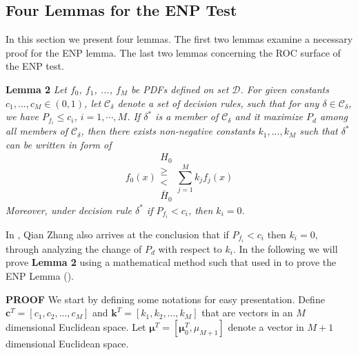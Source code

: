 \subsection{Four Lemmas for the ENP Test}
In this section we present four lemmas. The first two lemmas examine a necessary proof for the ENP lemma. The last two lemmas concerning the ROC surface of the ENP test.  

\newcommand{\bmu}{\boldsymbol{\mu}}
\typeout{}


\noindent \textbf{Lemma 2}
\noindent \textit{
Let $f_0$, $f_1$, ..., $f_M$ be PDFs defined on set $\mathcal{D}$. For given constants $c_1, ..., c_M \in (0, 1)$, let $\mathcal{C}_\delta$ denote a set of decision rules,  such that for any $\delta \in \mathcal{C}_\delta$, we have $P_{f_i} \leq c_i$, $i = 1, \cdots, M$.
If  $\delta^{\ast}$ is a member of $\mathcal{C}_\delta$ and it maximize $P_d$ among all members of $\mathcal{C}_\delta$, then there exists non-negative constants $k_1, ..., k_M$ such that $\delta^\ast$ can be written in form of  
\begin{equation}
f_0(x) \substack{H_0 \\ \geq \\ < \\ \bar{H}_0} \sum_{j=1}^{M}k_jf_j(x)
\end{equation}
Moreover, under decision rule $\delta^\ast$ if  $P_{f_i} < c_i$, then $k_i = 0$. 
}

In \cite{zhang1999design, zhang2000efficient}, Qian Zhang also arrives at the conclusion that if $P_{f_i} < c_i$ then $k_i = 0$, through analyzing the change of $P_d$ with respect to $k_i$. In the following we will prove \textbf{Lemma 2} using a mathematical method such that used in \cite{LehmannTest, dantzig1951fundamental} to prove the ENP Lemma ().

\noindent\textbf{PROOF}
We start by defining some notations for easy presentation.
Define $\mathbf{c}^T = [c_1, c_2, ..., c_M]$ and  $\mathbf{k}^T = [k_1, k_2, ..., k_M]$ that are vectors in an $M$ dimensional Euclidean  space. Let $\bmu^T = [\bmu_0^T, \mu_{M+1}]$ denote a vector in $M+1$ dimensional Euclidean space. 

